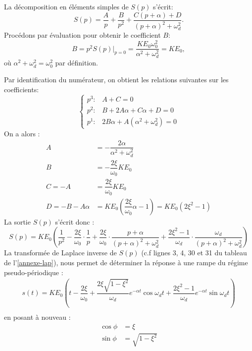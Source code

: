 La décomposition en éléments simples de $S(p)$ s'écrit:
\[
S(p)=\dfrac{A}{p}+\dfrac{B}{p^2}+\dfrac{C(p+\alpha)+D}{(p+\alpha)^2+\omega_d^2}.
\] 
Procédons par évaluation pour obtenir le coefficient $B$:
\[
B=p^2S(p)\Big|_{p=0}=\dfrac{KE_0\omega_0^2}{\alpha^2+\omega_d^2}=KE_0,
\]
où $\alpha^2+\omega_d^2=\omega_0^2$ par définition.

Par identification du numérateur,
on obtient les relations suivantes sur les coefficients:
\[
\begin{cases}
    p^3:\,\,\,\,\,A+C=0\\
    p^2:\,\,\,\,\,B+2A\alpha+C\alpha+D=0\\
    p^1:\,\,\,\,\,2B\alpha+A(\alpha^2+\omega_d^2)=0
\end{cases}
\]
On a alors :
\begin{align*}
    A&=-\dfrac{2\alpha}{\alpha^2+\omega_d^2}\\
    B&=-\dfrac{2\xi}{\omega_0}KE_0\\
    C=-A&=\dfrac{2\xi}{\omega_0}KE_0\\
    D=-B-A\alpha&=KE_0\left(\dfrac{2\xi}{\omega_0}\alpha-1\right)=KE_0(2\xi^2-1)
\end{align*}
La sortie $S(p)$ s'écrit donc :
\[
S(p)=KE_0\left(\dfrac{1}{p^2}-\dfrac{2\xi}{\omega_0}\cdot
               \dfrac{1}{p}+\dfrac{2\xi}{\omega_0}\cdot
			   \dfrac{p+\alpha}{(p+\alpha)^2+\omega_d^2}+
			   \dfrac{2\xi^2-1}{\omega_d}\cdot\dfrac{\omega_d}
			   {(p+\alpha)^2+\omega_d^2}\right)
\]
La transformée de Laplace inverse de $S(p)$ (c.f lignes 3, 4, 30 
et 31 du tableau de l'\cref{annexe-lap}), nous permet de déterminer la 
réponse à une rampe du régime pseudo-périodique :
\begin{align*}
    s(t)=KE_0\left(t-\dfrac{2\xi}{\omega_0}+
    \dfrac{2\xi\sqrt{1-\xi^2}}{\omega_d}
    e^{-\alpha t}\cos{\omega_d t}+
    \dfrac{2\xi^2-1}{\omega_d}e^{-\alpha t}\sin{\omega_d t}
    \right)\\
\end{align*}
en posant à nouveau : 
\begin{align*}
    \cos{\phi}&=\xi\\
    \sin{\phi}&=\sqrt{1-\xi^2}
\end{align*}
